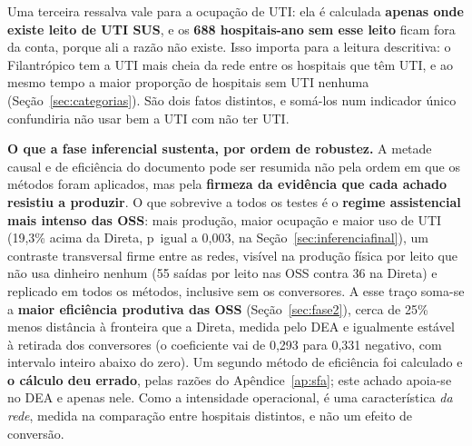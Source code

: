 Uma terceira ressalva vale para a ocupação de UTI: ela é calculada
\textbf{apenas onde existe leito de UTI SUS}, e os \textbf{688
hospitais-ano sem esse leito} ficam fora da conta, porque ali a razão não
existe. Isso importa para a leitura descritiva: o Filantrópico tem a UTI
mais cheia da rede entre os hospitais que têm UTI, e ao mesmo tempo a
maior proporção de hospitais sem UTI nenhuma (Seção~\ref{sec:categorias}).
São dois fatos distintos, e somá-los num indicador único confundiria não
usar bem a UTI com não ter UTI.

\textbf{O que a fase inferencial sustenta, por ordem de robustez.} A
metade causal e de eficiência do documento pode ser resumida não pela
ordem em que os métodos foram aplicados, mas pela \textbf{firmeza da
evidência que cada achado resistiu a produzir}. O que sobrevive a todos
os testes é o \textbf{regime assistencial mais intenso das OSS}: mais
produção, maior ocupação e maior uso de UTI (19,3\% acima da Direta,
p~igual a 0,003, na Seção~\ref{sec:inferenciafinal}), um contraste
transversal firme entre as redes, visível na produção física por leito
que não usa dinheiro nenhum (55 saídas por leito nas OSS contra 36 na
Direta) e replicado em todos os métodos, inclusive sem os conversores.
A esse traço soma-se a \textbf{maior eficiência produtiva das OSS}
(Seção~\ref{sec:fase2}), cerca de 25\% menos distância à fronteira que
a Direta, medida pelo DEA e igualmente estável à retirada
dos conversores (o coeficiente vai de 0,293 para 0,331 negativo, com
intervalo inteiro abaixo do zero). Um segundo método de eficiência foi
calculado e \textbf{o cálculo deu errado}, pelas razões do
Apêndice~\ref{ap:sfa}; este achado apoia-se no
DEA e apenas nele. Como a intensidade operacional, é uma característica
\emph{da rede}, medida na comparação entre hospitais distintos, e não um
efeito de conversão.

